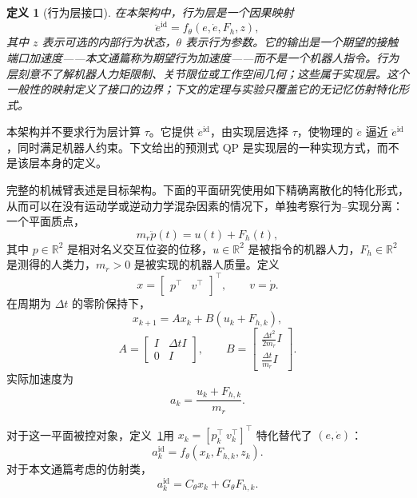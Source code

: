 \documentclass[journal]{IEEEtran}
\newtheorem{definition}{定义}
\begin{document}
\begin{definition}[行为层接口]
\label{def:interface}
在本架构中，行为层是一个因果映射
\begin{equation}
\ddot e^{\mathrm{id}} =f_\theta(e,\dot e,F_h,z),
\end{equation}
其中 $z$ 表示可选的内部行为状态，$\theta$ 表示行为参数。它的输出是一个期望的接触端口加速度——本文通篇称为\emph{期望行为加速度}——而不是一个机器人指令。行为层刻意不了解机器人力矩限制、关节限位或工作空间几何；这些属于实现层。这个一般性的映射定义了接口的边界；下文的定理与实验只覆盖它的无记忆仿射特化形式。
\end{definition}

本架构并不要求行为层计算 $\tau$。它提供 $\ddot e^{\mathrm{id}}$，由实现层选择 $\tau$，使物理的 $\ddot e$ 逼近 $\ddot e^{\mathrm{id}}$，同时满足机器人约束。下文给出的预测式 QP 是实现层的一种实现方式，而不是该层本身的定义。

完整的机械臂表述是目标架构。下面的平面研究使用如下精确离散化的特化形式，从而可以在没有运动学或逆动力学混杂因素的情况下，单独考察行为--实现分离：一个平面质点，
\begin{equation}
m_r\ddot p(t)=u(t)+F_h(t),
\end{equation}
其中 $p\in\mathbb R^2$ 是相对名义交互位姿的位移，$u\in\mathbb R^2$ 是被指令的机器人力，$F_h\in\mathbb R^2$ 是测得的人类力，$m_r>0$ 是被实现的机器人质量。定义
\begin{equation}
x=\begin{bmatrix}p^\top&v^\top\end{bmatrix}^\top,\qquad v=\dot p.
\end{equation}
在周期为 $\Delta t$ 的零阶保持下，
\begin{equation}
x_{k+1}=Ax_k+B(u_k+F_{h,k}),
\end{equation}
\begin{equation}
A= \begin{bmatrix} I&\Delta tI\\0&I \end{bmatrix}, \qquad
B= \begin{bmatrix} \frac{\Delta t^2}{2m_r}I\\ \frac{\Delta t}{m_r}I \end{bmatrix}.
\end{equation}
实际加速度为
\begin{equation}
a_k=\frac{u_k+F_{h,k}}{m_r}.
\end{equation}

对于这一平面被控对象，定义~\ref{def:interface}用 $x_k=[p_k^\top\ v_k^\top]^\top$ 特化替代了 $(e,\dot e)$：
\begin{equation}
a_k^{\mathrm{id}} =f_\theta(x_k,F_{h,k},z_k).
\end{equation}
对于本文通篇考虑的仿射类，
\begin{equation}
a_k^{\mathrm{id}}=C_\theta x_k+G_\theta F_{h,k}.
\end{equation}
\end{document}
